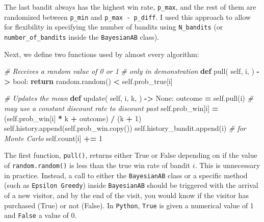 \documentclass[
]{book}
\newenvironment{Shaded}{\begin{snugshade}}{\end{snugshade}}
\newcommand{\BuiltInTok}[1]{#1}
\newcommand{\CommentTok}[1]{\textcolor[rgb]{0.56,0.35,0.01}{\textit{#1}}}
\newcommand{\ControlFlowTok}[1]{\textcolor[rgb]{0.13,0.29,0.53}{\textbf{#1}}}
\newcommand{\DecValTok}[1]{\textcolor[rgb]{0.00,0.00,0.81}{#1}}
\newcommand{\KeywordTok}[1]{\textcolor[rgb]{0.13,0.29,0.53}{\textbf{#1}}}
\newcommand{\NormalTok}[1]{#1}
\newcommand{\OperatorTok}[1]{\textcolor[rgb]{0.81,0.36,0.00}{\textbf{#1}}}
\newcommand{\VariableTok}[1]{\textcolor[rgb]{0.00,0.00,0.00}{#1}}
\theoremstyle{definition}
\theoremstyle{definition}
\theoremstyle{definition}
\theoremstyle{definition}
\theoremstyle{remark}
\begin{document}
The last bandit always has the highest win rate, \texttt{p\_max}, and the rest of them are randomized between \texttt{p\_min} and \texttt{p\_max\ -\ p\_diff}. I used this approach to allow for flexibility in specifying the number of bandits using \texttt{N\_bandits} (or \texttt{number\_of\_bandits} inside the \texttt{BayesianAB} class).

Next, we define two functions used by almost every algorithm:

\begin{Shaded}
\begin{Highlighting}[]
    \CommentTok{\# Receives a random value of 0 or 1}
    \CommentTok{\# only in demonstration}
    \KeywordTok{def}\NormalTok{ pull(}
            \VariableTok{self}\NormalTok{,}
\NormalTok{            i,}
\NormalTok{    ) }\OperatorTok{{-}\textgreater{}} \BuiltInTok{bool}\NormalTok{:}
        \ControlFlowTok{return}\NormalTok{ random.random() }\OperatorTok{\textless{}} \VariableTok{self}\NormalTok{.prob\_true[i]}

    \CommentTok{\# Updates the mean}
    \KeywordTok{def}\NormalTok{ update(}
            \VariableTok{self}\NormalTok{,}
\NormalTok{            i,}
\NormalTok{            k,}
\NormalTok{    ) }\OperatorTok{{-}\textgreater{}} \VariableTok{None}\NormalTok{:}
\NormalTok{        outcome }\OperatorTok{=} \VariableTok{self}\NormalTok{.pull(i)}
        \CommentTok{\# may use a constant discount rate to discount past}
        \VariableTok{self}\NormalTok{.prob\_win[i] }\OperatorTok{=}\NormalTok{ (}\VariableTok{self}\NormalTok{.prob\_win[i] }\OperatorTok{*}\NormalTok{ k }\OperatorTok{+}\NormalTok{ outcome) }\OperatorTok{/}\NormalTok{ (k }\OperatorTok{+} \DecValTok{1}\NormalTok{)}
        \VariableTok{self}\NormalTok{.history.append(}\VariableTok{self}\NormalTok{.prob\_win.copy())}
        \VariableTok{self}\NormalTok{.history\_bandit.append(i)  }\CommentTok{\# for Monte Carlo}
        \VariableTok{self}\NormalTok{.count[i] }\OperatorTok{+=} \DecValTok{1}
\end{Highlighting}
\end{Shaded}

The first function, \texttt{pull()}, returns either True or False depending on if the value of \texttt{random.random()} is less than the true win rate of bandit \(i\). This is unnecessary in practice. Instead, a call to either the \texttt{BayesianAB} class or a specific method (such as \texttt{Epsilon\ Greedy}) inside \texttt{BayesianAB} should be triggered with the arrival of a new visitor, and by the end of the visit, you would know if the visitor has purchased (True) or not (False). In \texttt{Python}, \texttt{True} is given a numerical value of 1 and \texttt{False} a value of 0.
\end{document}
